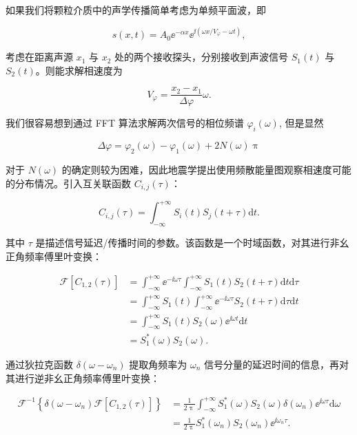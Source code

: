 如果我们将颗粒介质中的声学传播简单考虑为单频平面波，即

\begin{equation}
  s(x,t) = A_{0}{\ee}^{-\alpha x}{\ee}^{\ii(\omega x/V_{\varphi}-\omega t)},
  \label{eq:spherical_wave}
\end{equation}

考虑在距离声源 $x_{1}$ 与 $x_{2}$ 处的两个接收探头，分别接收到声波信号 $S_{1}(t)$ 与 $S_{2}(t)$。则能求解相速度为

\begin{equation}
  V_{\varphi} = \frac{x_{2}-x_{1}}{\Delta \varphi}\omega.
\end{equation}

我们很容易想到通过 FFT 算法求解两次信号的相位频谱 $\varphi_{i}(\omega)$, 但是显然

\begin{equation}
  \Delta \varphi = \varphi_{2}(\omega) - \varphi_{1}(\omega) + 2N(\omega)\uppi
\end{equation}

对于 $N(\omega)$ 的确定则较为困难，因此地震学提出使用频散能量图观察相速度可能的分布情况。引入互关联函数 $C_{i,j}(\tau)$：

\begin{equation}
  C_{i,j}(\tau) = \int_{-\infty}^{+\infty}S_{i}(t)S_{j}(t+\tau)\mathrm{d}t.
\end{equation}

其中 $\tau$ 是描述信号延迟/传播时间的参数。该函数是一个时域函数，对其进行非幺正角频率傅里叶变换：

\begin{align}
  \mathcal{F}[C_{1,2}(\tau)] &= \int_{-\infty}^{+\infty}{\ee}^{-\ii\omega\tau}\int_{-\infty}^{+\infty}S_{1}(t)S_{2}(t+\tau)\mathrm{d}t\mathrm{d}\tau \nonumber \\
  &= \int_{-\infty}^{+\infty}S_{1}(t)\int_{-\infty}^{+\infty}{\ee}^{-\ii\omega\tau}S_{2}(t+\tau)\mathrm{d}\tau\mathrm{d}t \nonumber \\
  &= \int_{-\infty}^{+\infty}S_{1}(t)S_{2}(\omega){\ee}^{\ii\omega t}\mathrm{d}t \nonumber \\
  &= S_{1}^{*}(\omega)S_{2}(\omega).
\end{align}

通过狄拉克函数 $\delta(\omega-\omega_{n})$ 提取角频率为 $\omega_{n}$ 信号分量的延迟时间的信息，再对其进行逆非幺正角频率傅里叶变换：

\begin{align}
  \mathcal{F}^{-1}\left\{\delta(\omega-\omega_{n})\mathcal{F}[C_{1,2}(\tau)]\right\} &= \frac{1}{2\uppi}\int_{-\infty}^{+\infty}S_{1}^{*}(\omega)S_{2}(\omega)\delta(\omega_{n}){\ee}^{\ii\omega\tau}\mathrm{d}\omega \nonumber \\
  &= \frac{1}{2\uppi}S_{1}^{*}(\omega_{n})S_{2}(\omega_{n}){\ee}^{\ii\omega_{n}\tau}.
\end{align}

